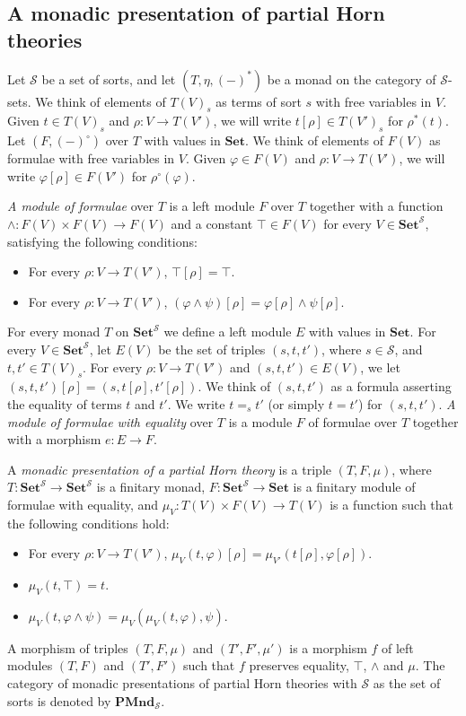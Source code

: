 \documentclass[reqno]{amsart}
\theoremstyle{definition}
\theoremstyle{remark}
\newcommand{\cat}[1]{\mathbf{#1}}
\newcommand{\Set}{\cat{Set}}
\newcommand{\PMnd}{\cat{PMnd}}
\numberwithin{figure}{section}
\begin{document}
\subsection{A monadic presentation of partial Horn theories}

Let $\mathcal{S}$ be a set of sorts, and let $(T,\eta,(-)^*)$ be a monad on the category of $\mathcal{S}$-sets.
We think of elements of $T(V)_s$ as terms of sort $s$ with free variables in $V$.
Given $t \in T(V)_s$ and $\rho : V \to T(V')$, we will write $t[\rho] \in T(V')_s$ for $\rho^*(t)$.
Let $(F,(-)^\circ)$ over $T$ with values in $\Set$.
We think of elements of $F(V)$ as formulae with free variables in $V$.
Given $\varphi \in F(V)$ and $\rho : V \to T(V')$, we will write $\varphi[\rho] \in F(V')$ for $\rho^\circ(\varphi)$.

\emph{A module of formulae} over $T$ is a left module $F$ over $T$ together with a function
    $\land : F(V) \times F(V) \to F(V)$ and a constant $\top \in F(V)$ for every $V \in \Set^\mathcal{S}$, satisfying the following conditions:
\begin{itemize}
\item For every $\rho : V \to T(V')$, $\top[\rho] = \top$.
\item For every $\rho : V \to T(V')$, $(\varphi \land \psi)[\rho] = \varphi[\rho] \land \psi[\rho]$.
\end{itemize}

For every monad $T$ on $\Set^\mathcal{S}$ we define a left module $E$ with values in $\Set$.
For every $V \in \Set^\mathcal{S}$, let $E(V)$ be the set of triples $(s,t,t')$, where $s \in \mathcal{S}$, and $t,t' \in T(V)_s$.
For every $\rho : V \to T(V')$ and $(s,t,t') \in E(V)$, we let $(s,t,t')[\rho] = (s,t[\rho],t'[\rho])$.
We think of $(s,t,t')$ as a formula asserting the equality of terms $t$ and $t'$.
We write $t =_s t'$ (or simply $t = t'$) for $(s,t,t')$.
\emph{A module of formulae with equality} over $T$ is a module $F$ of formulae over $T$ together with a morphism $e : E \to F$.

\begin{defn}
A \emph{monadic presentation of a partial Horn theory} is a triple $(T,F,\mu)$, where $T : \Set^\mathcal{S} \to \Set^\mathcal{S}$ is a finitary monad,
    $F : \Set^\mathcal{S} \to \Set$ is a finitary module of formulae with equality, and
    $\mu_V : T(V) \times F(V) \to T(V)$ is a function such that the following conditions hold:
\begin{itemize}
\item For every $\rho : V \to T(V')$, $\mu_V(t,\varphi)[\rho] = \mu_{V'}(t[\rho],\varphi[\rho])$.
\item $\mu_V(t, \top) = t$.
\item $\mu_V(t, \varphi \land \psi) = \mu_V(\mu_V(t, \varphi), \psi)$.
\end{itemize}
A morphism of triples $(T,F,\mu)$ and $(T',F',\mu')$ is a morphism $f$ of left modules $(T,F)$ and $(T',F')$ such that $f$ preserves equality, $\top$, $\land$ and $\mu$.
The category of monadic presentations of partial Horn theories with $\mathcal{S}$ as the set of sorts is denoted by $\PMnd_\mathcal{S}$.
\end{defn}
\end{document}
